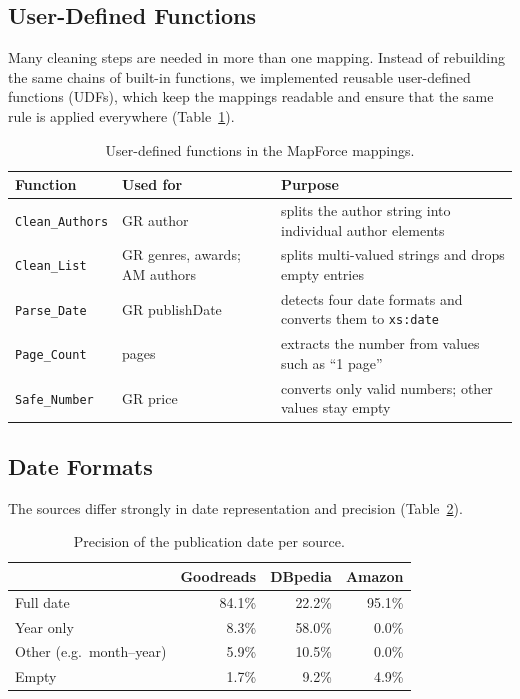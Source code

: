 \documentclass[runningheads]{llncs}
\begin{document}
\subsection{User-Defined Functions}
Many cleaning steps are needed in more than one mapping. Instead of rebuilding
the same chains of built-in functions, we implemented reusable user-defined
functions (UDFs), which keep the mappings readable and ensure that the same
rule is applied everywhere (Table~\ref{tab:udf}).

\begin{table}[htbp]
\centering
\caption{User-defined functions in the MapForce mappings.}
\label{tab:udf}
\footnotesize
\begin{tabularx}{\textwidth}{@{}l l >{\RaggedRight\arraybackslash}X@{}}
\toprule
\textbf{Function} & \textbf{Used for} & \textbf{Purpose} \\
\midrule
\texttt{Clean\_Authors} & GR author & splits the author string into individual author elements \\
\texttt{Clean\_List} & GR genres, awards; AM authors & splits multi-valued strings and drops empty entries \\
\texttt{Parse\_Date} & GR publishDate & detects four date formats and converts them to \texttt{xs:date} \\
\texttt{Page\_Count} & pages & extracts the number from values such as ``1 page'' \\
\texttt{Safe\_Number} & GR price & converts only valid numbers; other values stay empty \\
\bottomrule
\end{tabularx}
\end{table}

\subsection{Date Formats}
The sources differ strongly in date representation and precision
(Table~\ref{tab:dates}).

\begin{table}[htbp]
\centering
\caption{Precision of the publication date per source.}
\label{tab:dates}
\footnotesize
\begin{tabular}{lrrr}
\toprule
 & \textbf{Goodreads} & \textbf{DBpedia} & \textbf{Amazon} \\
\midrule
Full date               & 84.1\% & 22.2\% & 95.1\% \\
Year only               &  8.3\% & 58.0\% &  0.0\% \\
Other (e.g.\ month--year) & 5.9\% & 10.5\% & 0.0\% \\
Empty                   &  1.7\% &  9.2\% &  4.9\% \\
\bottomrule
\end{tabular}
\end{table}
\end{document}

